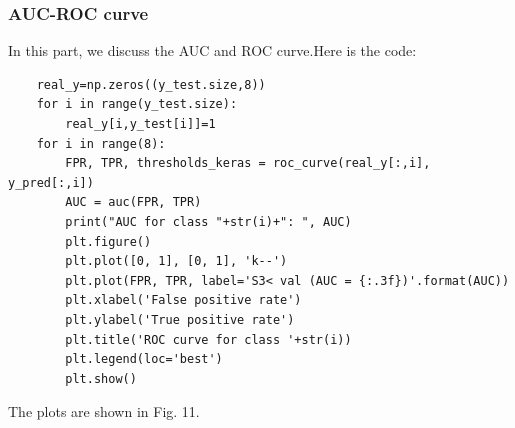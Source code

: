 \documentclass[conference]{IEEEtran}
\begin{document}
\subsubsection{AUC-ROC curve}
In this part, we discuss the AUC and ROC curve.Here is the code:
\begin{lstlisting}
    real_y=np.zeros((y_test.size,8))
    for i in range(y_test.size):
        real_y[i,y_test[i]]=1
    for i in range(8):
        FPR, TPR, thresholds_keras = roc_curve(real_y[:,i], y_pred[:,i]) 
        AUC = auc(FPR, TPR)  
        print("AUC for class "+str(i)+": ", AUC)
        plt.figure()
        plt.plot([0, 1], [0, 1], 'k--')
        plt.plot(FPR, TPR, label='S3< val (AUC = {:.3f})'.format(AUC))
        plt.xlabel('False positive rate')
        plt.ylabel('True positive rate')
        plt.title('ROC curve for class '+str(i))
        plt.legend(loc='best')
        plt.show()    
\end{lstlisting}

The plots are shown in Fig. 11.
\end{document}
